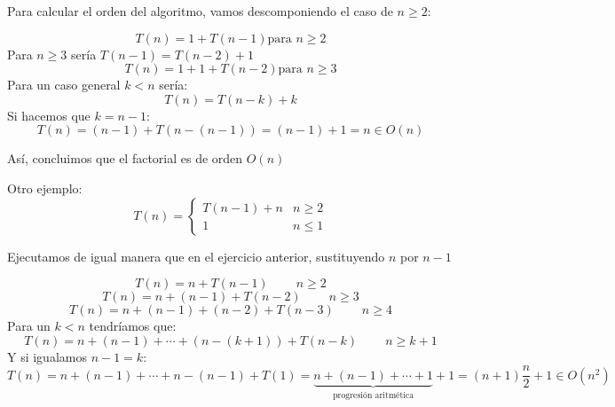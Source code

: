 \documentclass[10pt,a4paper,spanish]{report}
\begin{document}
\noindent
Para calcular el orden del algoritmo, vamos descomponiendo el caso de $n \geq 2$:
\begin{center}
\begin{displaymath}
T(n) = 1 + T(n-1) \textrm{para $n \geq 2$}
\end{displaymath}
Para $n \geq 3$ sería $T(n-1) = T(n-2) + 1$
\begin{displaymath}
T(n) = 1 + 1 + T(n-2) \textrm{para $n \geq 3$}
\end{displaymath}
Para un caso general $k < n$ sería:
\begin{displaymath}
T(n) = T(n - k) + k
\end{displaymath}
Si hacemos que $k = n-1$:
\begin{displaymath}
T(n) = (n-1) + T(n - (n-1)) = (n - 1) + 1 = n \in O(n)
\end{displaymath}
\end{center}

\noindent
Así, concluimos que el factorial es de orden $O(n)$

\noindent
Otro ejemplo:
\begin{displaymath}
T(n) = \left\{ \begin{array}{ll}
T(n-1)+n  &  n \geq 2\\
1         &  n \leq 1
\end{array} \right.
\end{displaymath}

\noindent
Ejecutamos de igual manera que en el ejercicio anterior, sustituyendo $n$ por $n-1$

\begin{displaymath}
T(n) = n + T(n-1) \qquad\ n \geq 2
\end{displaymath}
\begin{displaymath}
T(n) = n + (n-1) + T(n-2) \qquad\ n \geq 3
\end{displaymath}
\begin{displaymath}
T(n) = n + (n-1) + (n-2) + T(n-3) \qquad\ n \geq 4
\end{displaymath}
\noindent
Para un $k < n$ tendríamos que:
\begin{displaymath}
T(n) = n+ (n-1) + \cdots + (n - (k + 1)) + T (n-k) \qquad\ n \geq k+1
\end{displaymath}
\noindent
Y si igualamos $n-1 = k $:
\begin{displaymath}
T(n) = n + (n - 1) + \cdots + n - (n-1) + T(1) =\underbrace{n + (n-1) + \cdots + 1}_{\textrm{progresión aritmética}} + 1 = (n+1)\frac{n}{2} + 1 \in O(n^{2})
\end{displaymath}
\end{document}

